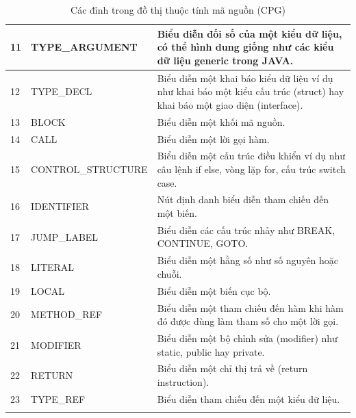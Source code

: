 \begin{longtable}{| p{} | p{} | p{} |}
11  & TYPE\_ARGUMENT     & Biểu diễn đối số của một kiểu dữ liệu, có thể hình dung giống như các kiểu dữ liệu generic trong JAVA.                                                          \\ \hline
12  & TYPE\_DECL         & Biểu diễn một khai báo kiểu dữ liệu ví dụ như khai báo một kiểu cấu trúc (struct) hay khai báo một giao diện (interface).                                       \\ \hline
13  & BLOCK             & Biểu diễn một khối mã nguồn.                                                                                                                                    \\ \hline
14  & CALL              & Biểu diễn một lời gọi hàm.                                                                                                                                      \\ \hline
15  & CONTROL\_STRUCTURE & Biểu diễn một cấu trúc điều khiển ví dụ như câu lệnh if else, vòng lặp for, cấu trúc switch case.                                                               \\ \hline
16  & IDENTIFIER        & Nút định danh biểu diễn tham chiếu đến một biến.                                                                                                                \\ \hline
17  & JUMP\_LABEL        & Biểu diễn các cấu trúc nhảy như BREAK, CONTINUE, GOTO.                                                                                                          \\ \hline
18  & LITERAL           & Biểu diễn một hằng số như số nguyên hoặc chuỗi.                                                                                                                 \\ \hline
19  & LOCAL             & Biểu diễn một biến cục bộ.                                                                                                                                      \\ \hline
20  & METHOD\_REF        & Biểu diễn một tham chiếu đến hàm khi hàm đó được dùng làm tham số cho một lời gọi.                                                                              \\ \hline
21  & MODIFIER          & Biểu diễn một bộ chỉnh sửa (modifier) như static, public hay private.                                                                                           \\ \hline
22  & RETURN            & Biểu diễn một chỉ thị trả về (return instruction).                                                                                                              \\ \hline
23  & TYPE\_REF          & Biểu diễn tham chiếu đến một kiểu dữ liệu.                                                                                                                      \\ \hline
\caption{Các đỉnh trong đồ thị thuộc tính mã nguồn (CPG)}
\label{table:c3_nodecpgjoern}
\end{longtable}
\medskip

